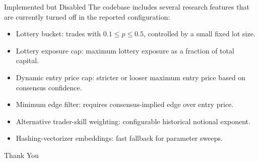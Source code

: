 \documentclass[11pt,aspectratio=169]{beamer}
\begin{document}
\begin{frame}{Implemented but Disabled}
  The codebase includes several research features that are currently turned off
  in the reported configuration:

  \vspace{0.2cm}
  \begin{itemize}
    \item Lottery bucket: trades with $0.1 \leq p \leq 0.5$, controlled by a small fixed lot size.
    \item Lottery exposure cap: maximum lottery exposure as a fraction of total capital.
    \item Dynamic entry price cap: stricter or looser maximum entry price based on consensus confidence.
    \item Minimum edge filter: requires consensus-implied edge over entry price.
    \item Alternative trader-skill weighting: configurable historical notional exponent.
    \item Hashing-vectorizer embeddings: fast fallback for parameter sweeps.
  \end{itemize}
\end{frame}

\begin{frame}
  \centering
  \Huge Thank You
\end{frame}
\end{document}
